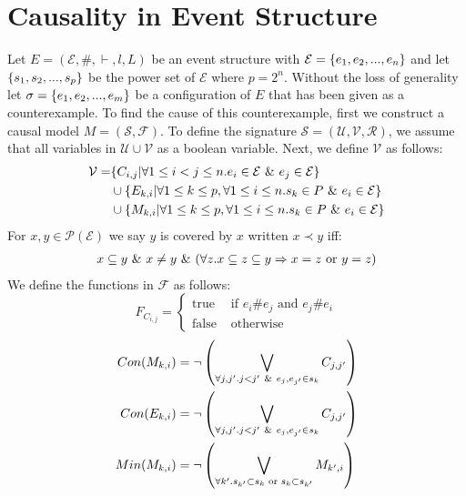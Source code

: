 \documentclass{article}
\begin{document}
\section{Causality in Event Structure}
Let $E = (\mathcal{E},\#,\vdash,l,L)$ be an event structure with
$\mathcal{E} = \{e_1, e_2, ...,e_n\}$ and let $\{s_1,s_2,...,s_p\}$ be the power set of $\mathcal{E}$ where $p = 2^n$.
Without the loss of generality let $\sigma = \{e_1,e_2,...,e_m\}$ be a configuration of $E$ that
has been given as a counterexample.
To find the cause of this counterexample, first we construct a causal model $M = (\mathcal{S},\mathcal{F})$.
To define the signature $\mathcal{S} = (\mathcal{U},\mathcal{V},\mathcal{R})$, we assume that all variables in $\mathcal{U} \cup \mathcal{V}$ as a boolean variable.
Next, we define $\mathcal{V}$ as follows:
\begin{align*}
    \mathcal{V} = & \{C_{i,j} | \forall 1 \leq i < j \leq n. e_i \in \mathcal{E} \ \& \  e_j \in \mathcal{E}\}                    \\
                  & \cup \{E_{k,i} | \forall 1 \leq k \leq p , \forall 1 \leq i \leq n . s_k \in P \ \& \  e_i \in \mathcal{E} \} \\
                  & \cup \{M_{k,i} | \forall 1 \leq k \leq p , \forall 1 \leq i \leq n . s_k \in P \ \& \  e_i \in \mathcal{E} \} \\
\end{align*}
For $x,y \in \mathcal{P}(\mathcal{E})$ we say $y$ is covered by $x$ written $ x \prec y$ iff:
\begin{align*}
    x \subseteq y \ \& \  x \neq y \ \& \ 
    (\forall z. x \subseteq z \subseteq y \Rightarrow x = z
    \text{ or } y = z)
\end{align*}
We define the functions in $\mathcal{F}$ as follows:
$$
    F_{C_{i,j}} = \begin{cases}
        \text{true}  & \text{ if } e_i \# e_j \text{ and } e_j \# e_i \\
        \text{false} & \text{ otherwise }
    \end{cases}
$$
\begin{align*}
    Con(M_{k,i})     & =   \neg \left(
    \bigvee_{\forall j,j'. j<j' \ \& \  e_j,e_{j'} \in s_k} C_{j,j'}
    \right)                                                                  \\
    Con(E_{k,i})     & =   \neg \left(
    \bigvee_{\forall j,j'. j<j' \ \& \  e_j,e_{j'} \in s_k} C_{j,j'}
    \right)                                                                  \\
    Min(M_{k,i})     & = \neg \left(
    \bigvee_{
        \forall k'. s_{k'} \subset s_k \text{ or } s_k \subset s_{k'}
    } M_{k',i}
    \right)                                                                  \\
\end{align*}
\end{document}
